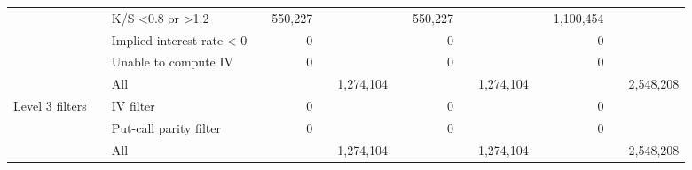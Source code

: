 \begin{tabular}{*{4}{l} *{11}{r} }
				  & & K/S <0.8 or >1.2 & &
				550,227 & &  & &
				550,227 & &  & &
				1,100,454 & &  \\
			
				  & & Implied interest rate < 0 & &
				0 & &  & &
				0 & &  & &
				0 & &  \\
			
				  & & Unable to compute IV & &
				0 & &  & &
				0 & &  & &
				0 & &  \\
			
				  & & All & &
				 & & 1,274,104 & &
				 & & 1,274,104 & &
				 & & 2,548,208 \\
			
				Level 3 filters & & IV filter & &
				0 & &  & &
				0 & &  & &
				0 & &  \\
			
				  & & Put-call parity filter & &
				0 & &  & &
				0 & &  & &
				0 & &  \\
			
				  & & All & &
				 & & 1,274,104 & &
				 & & 1,274,104 & &
				 & & 2,548,208 \\
			

	        \hline
	    \end{tabular}
	